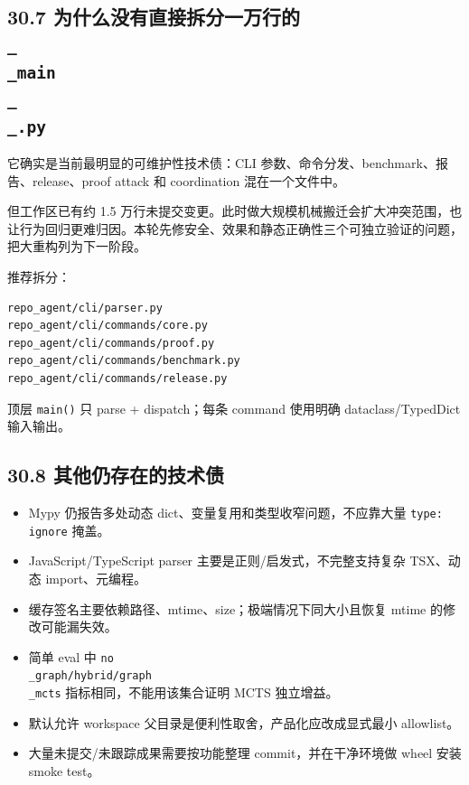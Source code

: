 \documentclass[UTF8,12pt,openany]{ctexbook}
\begin{document}
\subsection{30.7 为什么没有直接拆分一万行的 \texttt{\\_\\_main\\_\\_.py}}

它确实是当前最明显的可维护性技术债：CLI 参数、命令分发、benchmark、报告、release、proof attack 和 coordination 混在一个文件中。\par

但工作区已有约 1.5 万行未提交变更。此时做大规模机械搬迁会扩大冲突范围，也让行为回归更难归因。本轮先修安全、效果和静态正确性三个可独立验证的问题，把大重构列为下一阶段。\par

推荐拆分：\par

\begin{lstlisting}
repo_agent/cli/parser.py
repo_agent/cli/commands/core.py
repo_agent/cli/commands/proof.py
repo_agent/cli/commands/benchmark.py
repo_agent/cli/commands/release.py
\end{lstlisting}

顶层 \texttt{main()} 只 parse + dispatch；每条 command 使用明确 dataclass/TypedDict 输入输出。\par

\subsection{30.8 其他仍存在的技术债}

\begin{itemize}
\item Mypy 仍报告多处动态 dict、变量复用和类型收窄问题，不应靠大量 \texttt{type: ignore} 掩盖。
\item JavaScript/TypeScript parser 主要是正则/启发式，不完整支持复杂 TSX、动态 import、元编程。
\item 缓存签名主要依赖路径、mtime、size；极端情况下同大小且恢复 mtime 的修改可能漏失效。
\item 简单 eval 中 \texttt{no\\_graph/hybrid/graph\\_mcts} 指标相同，不能用该集合证明 MCTS 独立增益。
\item 默认允许 workspace 父目录是便利性取舍，产品化应改成显式最小 allowlist。
\item 大量未提交/未跟踪成果需要按功能整理 commit，并在干净环境做 wheel 安装 smoke test。
\end{itemize}
\end{document}
